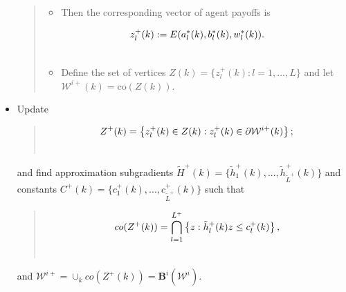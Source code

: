\documentclass[a4paper,10pt,english]{sphinxmanual}
\begin{document}
\begin{itemize}
\begin{quote}
\begin{itemize}
\item {} 
Then the corresponding vector of agent payoffs is

\end{itemize}
\begin{gather}
\begin{split}z^{+}_l (k) := E(a_{l}^{\ast}(k), b_{l}^{\ast}(k), w_{l}^{\ast}(k)).\end{split}\notag\\\begin{split}\end{split}\notag
\end{gather}\begin{itemize}
\item {} 
Define the set of vertices $Z(k) = \{ z^{+}_l (k) : l =
1,...,L \}$ and let $\mathcal{W}^{i+}(k) = \text{co} (Z(k))$.

\end{itemize}
\end{quote}

\item {} 
Update
\begin{quote}
\begin{gather}
\begin{split}Z^{+}(k) = \left\{ z^{+}_l (k) \in Z(k) : z^{+}_l (k) \in \partial\mathcal{W}^{i+}(k) \right\};\end{split}\notag\\\begin{split}\end{split}\notag
\end{gather}\end{quote}

and find approximation subgradients $\tilde{H}^{+}(k) = \{ \tilde{h}^{+}_1(k),...,\tilde{h}^{+}_{\tilde{L}^{+}}(k) \}$ and constants $C^{+}(k) = \{c^{+}_1(k),...,c^{+}_{\tilde{L}^+}(k) \}$ such that
\begin{quote}
\begin{gather}
\begin{split}co(Z^{+}(k)) = \bigcap_{l=1}^{\tilde{L}^{+}} \left\{ z: \tilde{h}_l^{+}(k) z \leq
c^{+}_l (k) \right\},\end{split}\notag\\\begin{split}\end{split}\notag
\end{gather}\end{quote}

and $\mathcal{W}^{i+} = \cup_{k} co(Z^{+}(k)) = \mathbf{B}^i (\mathcal{W}^i)$.

\end{itemize}
\end{document}
